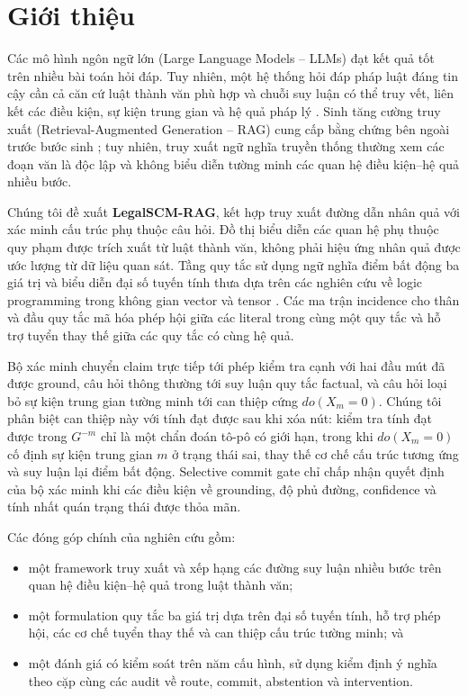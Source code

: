 \section{Giới thiệu}
\label{sec:introduction}

Các mô hình ngôn ngữ lớn (Large Language Models -- LLMs) đạt kết quả tốt trên
nhiều bài toán hỏi đáp. Tuy nhiên, một hệ thống hỏi đáp pháp luật đáng tin cậy
cần cả căn cứ luật thành văn phù hợp và chuỗi suy luận có thể truy vết, liên kết
các điều kiện, sự kiện trung gian và hệ quả pháp lý
\cite{chalkidis2020legalbert,guha2023legalbench}. Sinh tăng cường truy xuất
(Retrieval-Augmented Generation -- RAG) cung cấp bằng chứng bên ngoài trước
bước sinh \cite{lewis2020retrieval,gao2024ragsurvey}; tuy nhiên, truy xuất ngữ
nghĩa truyền thống thường xem các đoạn văn là độc lập và không biểu diễn tường
minh các quan hệ điều kiện--hệ quả nhiều bước.

Chúng tôi đề xuất \textbf{LegalSCM-RAG}, kết hợp truy xuất đường dẫn nhân quả
với xác minh cấu trúc phụ thuộc câu hỏi. Đồ thị biểu diễn các quan hệ phụ thuộc
quy phạm được trích xuất từ luật thành văn, không phải hiệu ứng nhân quả được
ước lượng từ dữ liệu quan sát. Tầng quy tắc sử dụng ngữ nghĩa điểm bất động ba
giá trị \cite{kleene1952metamathematics,fitting1985kripke} và biểu diễn đại số
tuyến tính thưa dựa trên các nghiên cứu về logic programming trong không gian
vector và tensor \cite{sato2020threevalued,sakama2021tensor}. Các ma trận
incidence cho thân và đầu quy tắc mã hóa phép hội giữa các literal trong cùng
một quy tắc và hỗ trợ tuyển thay thế giữa các quy tắc có cùng hệ quả.

Bộ xác minh chuyển claim trực tiếp tới phép kiểm tra cạnh với hai đầu mút đã
được ground, câu hỏi thông thường tới suy luận quy tắc factual, và câu hỏi loại
bỏ sự kiện trung gian tường minh tới can thiệp cứng $do(X_m=0)$. Chúng tôi phân
biệt can thiệp này với tính đạt được sau khi xóa nút: kiểm tra tính đạt được
trong $G^{-m}$ chỉ là một chẩn đoán tô-pô có giới hạn, trong khi
$do(X_m=0)$ cố định sự kiện trung gian $m$ ở trạng thái sai, thay thế cơ chế
cấu trúc tương ứng và suy luận lại điểm bất động. Selective commit gate chỉ
chấp nhận quyết định của bộ xác minh khi các điều kiện về grounding, độ phủ
đường, confidence và tính nhất quán trạng thái được thỏa mãn.

Các đóng góp chính của nghiên cứu gồm:
\begin{itemize}
    \item một framework truy xuất và xếp hạng các đường suy luận nhiều bước
    trên quan hệ điều kiện--hệ quả trong luật thành văn;
    \item một formulation quy tắc ba giá trị dựa trên đại số tuyến tính, hỗ trợ
    phép hội, các cơ chế tuyển thay thế và can thiệp cấu trúc tường minh; và
    \item một đánh giá có kiểm soát trên năm cấu hình, sử dụng kiểm định ý nghĩa
    theo cặp cùng các audit về route, commit, abstention và intervention.
\end{itemize}

